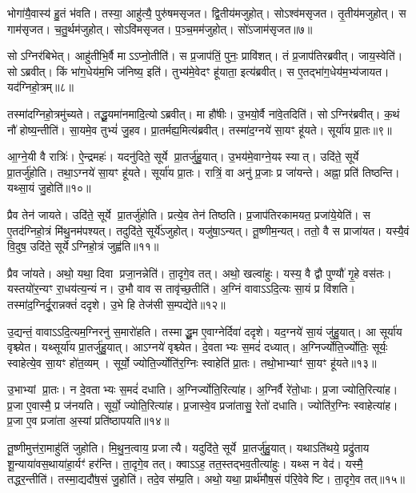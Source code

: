भोगा॑यै॒वास्य॑ हु॒तं भ॑वति।
तस्या॒ आहु॑त्यै॒ पुरु॑षमसृजत।
द्वि॒तीय॑मजुहोत्।
सोऽश्व॑मसृजत।
तृ॒तीय॑मजुहोत्।
स गाम॑सृजत।
च॒तु॒र्थम॑जुहोत्।
सोऽवि॑मसृजत।
प॒ञ्च॒मम॑जुहोत्।
सो॑ऽजाम॑सृजत॥७॥

सोऽग्निर॑बिभेत्।
आहु॑तीभि॒र्वै मा\-ऽऽप्नो॒तीति॑।
स प्र॒जाप॑तिं॒ पुनः॒ प्रावि॑शत्।
तं प्र॒जाप॑तिरब्रवीत्।
जाय॒स्वेति॑।
सोऽब्रवीत्।
किं भा॑ग॒धेय॑म॒भि ज॑निष्य॒ इति॑।
तुभ्य॑मे॒वेदꣳ हू॑याता॒ इत्य॑ब्रवीत्।
स ए॒तद्भा॑ग॒धेय॑म॒भ्य॑जायत।
यद॑ग्निहो॒त्रम्॥८॥

तस्मा॑दग्निहो॒त्रमु॑च्यते।
तद्धू॒यमा॑नमादि॒त्यो\-ऽब्रवीत्।
मा हौ॑षीः।
उ॒भयो॒र्वै ना॑वे॒तदिति॑।
सोऽग्निर॑ब्रवीत्।
क॒थं नौ॑ होष्य॒न्तीति॑।
सा॒यमे॒व तुभ्यं॑ जु॒हव\sn{}।
प्रा॒तर्मह्य॒मित्य॑ब्रवीत्।
तस्मा॑द॒ग्नये॑ सा॒यꣳ हू॑यते।
सूर्या॑य प्रा॒तः॥९॥

आ॒ग्ने॒यी वै रात्रिः॑।
ऐ॒न्द्रमहः॑।
यदनु॑दिते॒ सूर्ये प्रा॒तर्जु॑हु॒यात्।
उ॒भय॑मे॒वाग्ने॒यꣴ स्यात्।
उदि॑ते॒ सूर्ये प्रा॒तर्जु॑होति।
तथा॒ऽग्नये॑ सा॒यꣳ हू॑यते।
सूर्या॑य प्रा॒तः।
रात्रिं॒ वा अनु॑ प्र॒जाः प्र जा॑यन्ते।
अह्ना॒ प्रति॑ तिष्ठन्ति।
यथ्सा॒यं जु॒होति॑॥१०॥

प्रैव तेन॑ जायते।
उदि॑ते॒ सूर्ये प्रा॒तर्जु॑होति।
प्रत्ये॒व तेन॑ तिष्ठति।
प्र॒जाप॑तिरकामयत॒ प्रजा॑ये॒येति॑।
स ए॒तद॑ग्निहो॒त्रं मि॑थु॒नम॑पश्यत्।
तदुदि॑ते॒ सूर्ये॑\-ऽजुहोत्।
यजु॑षा॒\-ऽन्यत्।
तू॒ष्णीम॒न्यत्।
ततो॒ वै स प्राजा॑यत।
यस्यै॒वं वि॒दुष॒ उदि॑ते॒ सूर्ये\-ऽग्निहो॒त्रं जुह्व॑ति॥११॥

प्रैव जा॑यते।
अथो॒ यथा॒ दिवा प्रजा॒नन्नेति॑।
ता॒दृगे॒व तत्।
अथो॒ खल्वा॑हुः।
यस्य॒ वै द्वौ पुण्यौ॑ गृ॒हे वस॑तः।
यस्तयो॑र॒न्यꣳ रा॒धय॑त्य॒न्यं न।
उ॒भौ वाव स तावृ॑च्छ॒तीति॑।
अ॒ग्निं वावा\-ऽऽदि॒त्यः सा॒यं प्र वि॑शति।
तस्मा॑द॒ग्निर्दू॒रान्नक्तं॑ ददृशे।
उ॒भे हि तेज॑सी स॒म्पद्ये॑ते॥१२॥

उ॒द्यन्तं॒ वावा\-ऽऽदि॒त्यम॒ग्निरनु॑ स॒मारो॑हति।
तस्माद्धू॒म ए॒वाग्नेर्दिवा॑ ददृशे।
यद॒ग्नये॑ सा॒यं जु॑हु॒यात्।
आ सूर्या॑य वृश्च्येत।
यथ्सूर्या॑य प्रा॒तर्जु॑हु॒यात्।
आऽग्नये॑ वृश्च्येत।
दे॒वताभ्यः स॒मदं॑ दध्यात्।
अ॒ग्निर्ज्योति॒र्ज्योतिः॒ सूर्यः॒ स्वाहेत्ये॒व सा॒यꣳ हो॑त॒व्यम्।
सूर्यो॒ ज्योति॒र्ज्योति॑र॒ग्निः स्वाहेति॑ प्रा॒तः।
तथो॒भाभ्याꣳ॑ सा॒यꣳ हू॑यते॥१३॥

उ॒भाभ्यां प्रा॒तः।
न दे॒वताभ्यः स॒मदं॑ दधाति।
अ॒ग्निर्ज्योति॒\-रित्या॑ह।
अ॒ग्निर्वै रे॑तो॒धाः।
प्र॒जा ज्योति॒रित्या॑ह।
प्र॒जा ए॒वास्मै॒ प्र ज॑नयति।
सूर्यो॒ ज्योति॒रित्या॑ह।
प्र॒जास्वे॒व प्रजा॑तासु॒ रेतो॑ दधाति।
ज्योति॑र॒ग्निः स्वाहेत्या॑ह।
प्र॒जा ए॒व प्रजा॑ता अ॒स्यां प्रति॑ष्ठापयति॥१४॥

तू॒ष्णीमुत्त॑रा॒माहु॑तिं जुहोति।
मि॒थु॒न॒त्वाय॒ प्रजात्यै।
यदुदि॑ते॒ सूर्ये प्रा॒तर्जु॑हु॒यात्।
यथाऽति॑थये॒ प्रद्रु॑ताय शू॒न्याया॑वस॒थाया॑हा॒र्यꣳ॑ हर॑न्ति।
ता॒दृगे॒व तत्।
क्वाऽऽह॒ तत॒स्तद्भव॒तीत्या॑हुः।
यथ्स न वेद॑।
यस्मै॒ तद्धर॒न्तीति॑।
तस्मा॒द्यदौ॑ष॒सं जु॒होति॑।
तदे॒व स॑म्प्र॒ति।
अथो॒ यथा॒ प्रार्थ॑मौष॒सं प॑रि॒वेवेष्टि।
ता॒दृगे॒व तत्॥१५॥\anuvakamend[अ॒मृ॒ष्ट॒ वि॒चि॒किथ्स॑ति॒ जुह्व॑त्य॒जाम॑सृजताग्निहो॒त्रꣳ सूर्या॑य प्रा॒तर्जु॒होति॒ जुह्व॑ति स॒म्पद्ये॑ते हूयते स्थापयति सम्प्र॒ति द्वे च॑]

